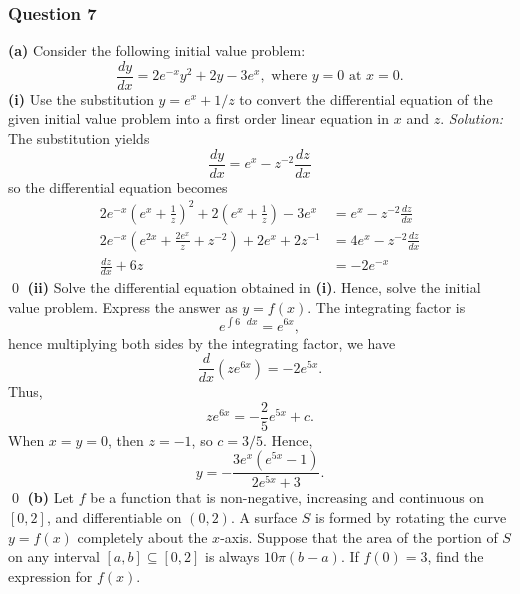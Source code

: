 \documentclass{article}
\begin{document}
\subsubsection*{Question 7}
\textbf{(a)} Consider the following initial value problem: \[\frac{dy}{dx}=2e^{-x}y^2+2y-3e^x,\text{ where }y=0\text{ at }x=0.\]
\textbf{(i)} Use the substitution $y=e^x+1/z$ to convert the differential equation of the given initial value problem into a first order linear equation in $x$ and $z$.
\newline
\newline\textit{Solution:} The substitution yields \[\frac{dy}{dx}={{e}^{x}}-{{z}^{-2}}\frac{dz}{dx}\] so the differential equation becomes \begin{align*}
   2{{e}^{-x}}{{\left( {{e}^{x}}+\frac{1}{z} \right)}^{2}}+2\left( {{e}^{x}}+\frac{1}{z} \right)-3{{e}^{x}}&={{e}^{x}}-{{z}^{-2}}\frac{dz}{dx} \\ 
  2{{e}^{-x}}\left( {{e}^{2x}}+\frac{2{{e}^{x}}}{z}+{{z}^{-2}} \right)+2{{e}^{x}}+2{{z}^{-1}}&=4{{e}^{x}}-{{z}^{-2}}\frac{dz}{dx} \\ 
  \frac{dz}{dx}+6z&=-2{{e}^{-x}}  
\end{align*}\qed 
\newline
\newline
\textbf{(ii)} Solve the differential equation obtained in \textbf{(i)}. Hence, solve the initial value problem. Express
the answer as $y=f(x)$.
\newline
\newline  The integrating factor is \[e^{\int 6\text{ }dx}=e^{6x},\] hence multiplying both sides by the integrating factor, we have \[\frac{d}{dx}\left(ze^{6x}\right)=-2e^{5x}.\] Thus, \[ze^{6x}=-\frac{2}{5}e^{5x}+c.\] When $x=y=0$, then $z=-1$, so $c=3/5$. Hence, \[y=-\frac{3e^x(e^{5x}-1)}{2e^{5x}+3}.\] \qed 
\newline
\newline \textbf{(b)} Let $f$ be a function that is non-negative, increasing and continuous on $[0,2]$, and differentiable on $(0,2)$. A surface $S$ is formed by rotating the curve $y=f(x)$ completely about the $x$-axis.
Suppose that the area of the portion of $S$ on any interval $[a,b] \subseteq [0,2]$ is always $10\pi(b-a)$. If
$f(0) = 3$, find the expression for $f(x)$.
\newline
\end{document}
